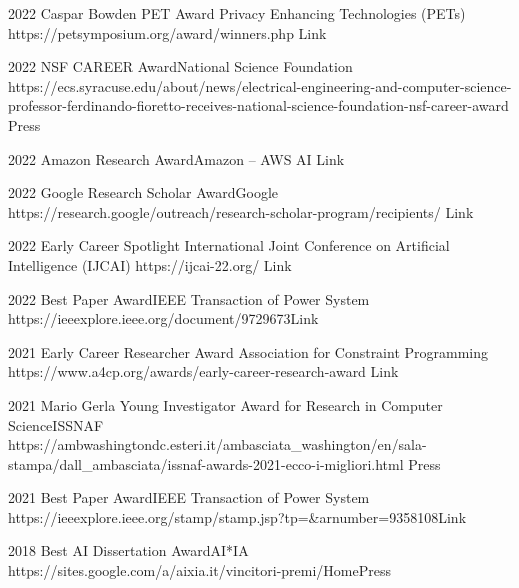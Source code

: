 \documentclass[localFont,alternative]{documentMETADATA}
\begin{document}
\begin{awards}
	\awardentry
	{2022}
	{Caspar Bowden PET Award}%
	{Privacy Enhancing Technologies (PETs)}
	{https://petsymposium.org/award/winners.php}
	{Link}

	\awardentry
	{2022}
	{NSF CAREER Award}{National Science Foundation}
	{https://ecs.syracuse.edu/about/news/electrical-engineering-and-computer-science-professor-ferdinando-fioretto-receives-national-science-foundation-nsf-career-award}
	{Press}

	\awardentry
	{2022}
	{Amazon Research Award}{Amazon -- AWS AI}
	{}
	{Link}

	\awardentry
	{2022}
	{Google Research Scholar Award}{Google}
	{https://research.google/outreach/research-scholar-program/recipients/}
	{Link}

	\awardentry
	{2022}
	{Early Career Spotlight}%
	{International Joint Conference on Artificial Intelligence (IJCAI)}
	{https://ijcai-22.org/}
	{Link}

	\awardentry
	{2022}
	{Best Paper Award}{IEEE Transaction of Power System}
	{https://ieeexplore.ieee.org/document/9729673}{Link}

	\awardentry
	{2021}
	{Early Career Researcher Award}
	{Association for Constraint Programming}
	{https://www.a4cp.org/awards/early-career-research-award}
	{Link}

	\awardentry
	{2021}
	{Mario Gerla Young Investigator Award for Research in Computer Science}{ISSNAF}
	{https://ambwashingtondc.esteri.it/ambasciata_washington/en/sala-stampa/dall_ambasciata/issnaf-awards-2021-ecco-i-migliori.html}
	{Press}

		
	\awardentry
	{2021}
	{Best Paper Award}{IEEE Transaction of Power System}
	{https://ieeexplore.ieee.org/stamp/stamp.jsp?tp=\&arnumber=9358108}{Link}

	\awardentry
	{2018}
	{Best AI Dissertation Award}{AI*IA} %
	{https://sites.google.com/a/aixia.it/vincitori-premi/Home}{Press}


\end{awards}	
\end{document}
